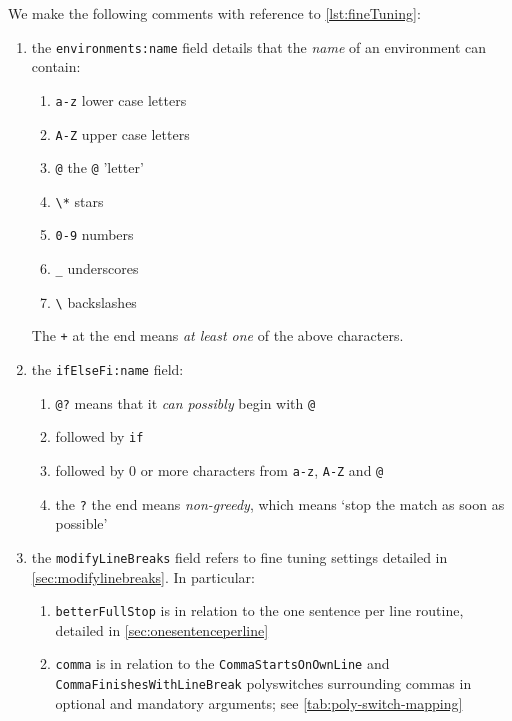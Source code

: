  We make the following comments with reference to \cref{lst:fineTuning}:
 \begin{enumerate}
  \item the \texttt{environments:name} field details that the \emph{name} of an
        environment can contain:
        \begin{enumerate}
         \item \texttt{a-z} lower case letters
         \item \texttt{A-Z} upper case letters
         \item \texttt{@} the \texttt{@} 'letter'
         \item \lstinline!\*! stars
         \item \texttt{0-9} numbers
         \item \lstinline!_! underscores
         \item \lstinline!\! backslashes
        \end{enumerate}
        The \texttt{+} at the end means \emph{at least one} of the above characters.
  \item the \texttt{ifElseFi:name} field:
        \begin{enumerate}
         \item \lstinline^@?^ means that it \emph{can possibly} begin with
               \lstinline^@^
         \item followed by \texttt{if}
         \item followed by 0 or more characters from \texttt{a-z}, \texttt{A-Z} and
               \texttt{@}
         \item the \texttt{?} the end means \emph{non-greedy}, which means `stop the
               match as soon as possible'
        \end{enumerate}
  \item the \texttt{modifyLineBreaks} field refers to fine tuning settings detailed in
        \vref{sec:modifylinebreaks}. In particular:
        \begin{enumerate}
         \item \texttt{betterFullStop} is in relation to the one sentence per line routine, detailed in
               \vref{sec:onesentenceperline}
         \item \texttt{comma} is in relation to the \texttt{CommaStartsOnOwnLine} and
               \texttt{CommaFinishesWithLineBreak} polyswitches surrounding commas in optional and
               mandatory arguments; see \vref{tab:poly-switch-mapping}
        \end{enumerate}
 \end{enumerate}

